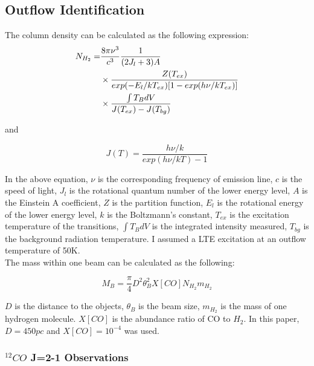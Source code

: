 \documentclass[twoside,11pt]{gshs_thesis}
\begin{document}
\subsection{Outflow Identification}

The column density can be calculated as the following expression:
\begin{align}
N_{H_2} =& \frac{8\pi \nu^3}{c^3} \frac{1}{(2J_l +3)A}  \notag \\
& \times \frac{Z(T_{ex})}{exp(-E_l / kT_{ex})[1-exp(h\nu / kT_{ex})]} \notag \\
& \times \frac{\int T_B dV}{J(T_{ex})-J(T_{bg})}
\end{align}

and

\begin{equation}
	J(T) = \frac{h \nu / k}{exp(h\nu / kT)-1}
\end{equation}

In the above equation, $\nu$ is the corresponding frequency of emission line, $c$ is the speed of light, $J_l$ is the rotational quantum number of the lower energy level, $A$ is the Einstein A coefficient, $Z$ is the partition function, $E_l$ is the rotational energy of the lower energy level, $k$ is the Boltzmann's constant, $T_{ex}$ is the excitation temperature of the transitions, $\int T_B dV$ is the integrated intensity measured, $T_{bg}$ is the background radiation temperature. I assumed a LTE excitation at an outflow temperature of 50K. \cite{Takahashi}\\

The mass within one beam can be calculated as the following:

\begin{equation}
M_B =  \frac{\pi}{4} D^2 \theta_B ^2 X[CO] N_{H_2} m_{H_2}
\end{equation}

$D$ is the distance to the objects, $\theta_B$ is the beam size, $m_{H_2}$ is the mass of one hydrogen molecule. $X[CO]$ is the abundance ratio of CO to $H_2$. In this paper, $D = 450pc$ and $X[CO] = 10^{-4}$ was used. \cite{Hatchell2}\\



\subsubsection{$^{12}CO$ J=2-1 Observations}
\end{document}
